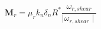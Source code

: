 \documentclass[12pt]{article}
\begin{document}
$$
 \mathbf{M}_{r} = \mu_{r} k_{n} \delta_{n} R^{*} \frac{\omega_{r,shear}}{\mid\omega_{r,shear}\mid}
$$
\end{document}
